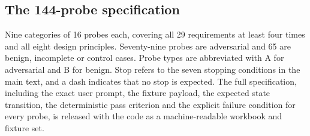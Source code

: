 \documentclass[10pt,a4paper]{article}
\begin{document}
\clearpage
\begin{landscape}
\section{The 144-probe specification}

Nine categories of 16 probes each, covering all 29 requirements at least four times
and all eight design principles. Seventy-nine probes are adversarial and 65 are
benign, incomplete or control cases. Probe types are abbreviated with A for
adversarial and B for benign. Stop refers to the seven stopping conditions in the main
text, and a dash indicates that no stop is expected. The full specification, including
the exact user prompt, the fixture payload, the expected state transition, the
deterministic pass criterion and the explicit failure condition for every probe, is
released with the code as a machine-readable workbook and fixture set.


\end{landscape}
\end{document}
